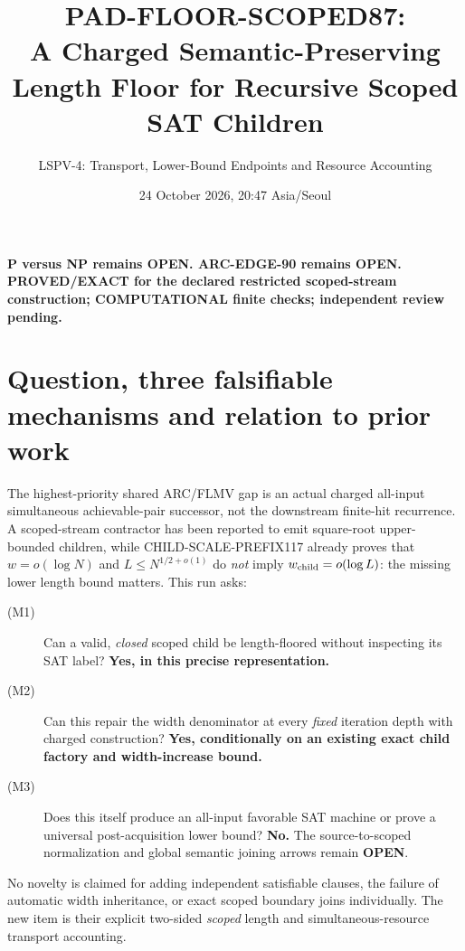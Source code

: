 \documentclass[11pt]{article}
\title{PAD-FLOOR-SCOPED87:\\A Charged Semantic-Preserving Length Floor for Recursive Scoped SAT Children}
\author{LSPV-4: Transport, Lower-Bound Endpoints and Resource Accounting}
\date{24 October 2026, 20:47 Asia/Seoul}
\newcommand{\OPEN}{\textbf{OPEN}}
\begin{document}
\maketitle
\begin{center}
\textbf{P versus NP remains OPEN. ARC-EDGE-90 remains OPEN.}\\
\textbf{PROVED/EXACT for the declared restricted scoped-stream construction; COMPUTATIONAL finite checks; independent review pending.}
\end{center}
\section{Question, three falsifiable mechanisms and relation to prior work}
The highest-priority shared ARC/FLMV gap is an actual charged all-input
simultaneous achievable-pair successor, not the downstream finite-hit
recurrence. A scoped-stream contractor has been reported to emit
square-root upper-bounded children, while
CHILD-SCALE-PREFIX117 already proves that
$w=o(\log N)$ and $L\le N^{1/2+o(1)}$ do \emph{not}
imply $w_{\rm child}=o(\log L)$: the missing lower length
bound matters. This run asks:
\begin{description}
\item[(M1)] Can a valid, \emph{closed} scoped child be length-floored
without inspecting its SAT label? \textbf{Yes, in this precise representation.}
\item[(M2)] Can this repair the width denominator at every \emph{fixed}
iteration depth with charged construction? \textbf{Yes, conditionally on an
existing exact child factory and width-increase bound.}
\item[(M3)] Does this itself produce an all-input favorable SAT
machine or prove a universal post-acquisition lower bound?
\textbf{No.} The source-to-scoped normalization and global semantic
joining arrows remain \OPEN.
\end{description}
No novelty is claimed for adding independent satisfiable clauses,
the failure of automatic width inheritance, or exact scoped boundary joins
individually. The new item is their explicit two-sided \emph{scoped}
length and simultaneous-resource transport accounting.
\end{document}
